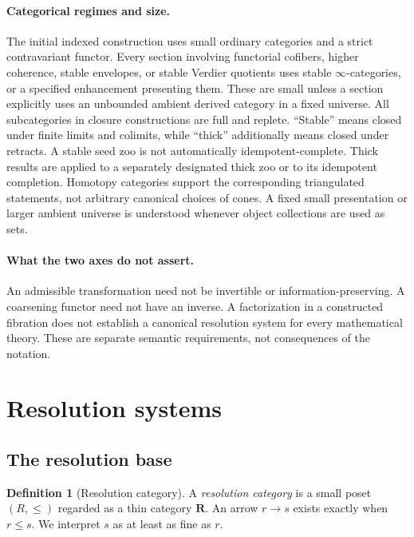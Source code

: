 \documentclass[11pt]{article}
\theoremstyle{definition}
\newtheorem{definition}[theorem]{Definition}
\theoremstyle{remark}
\newcommand{\Rcat}{\mathbf R}
\begin{document}
\paragraph{Categorical regimes and size.}
The initial indexed construction uses small ordinary categories and a strict contravariant functor. Every section involving functorial cofibers, higher coherence, stable envelopes, or stable Verdier quotients uses stable $\infty$-categories, or a specified enhancement presenting them. These are small unless a section explicitly uses an unbounded ambient derived category in a fixed universe. All subcategories in closure constructions are full and replete. ``Stable'' means closed under finite limits and colimits, while ``thick'' additionally means closed under retracts. A stable seed zoo is not automatically idempotent-complete. Thick results are applied to a separately designated thick zoo or to its idempotent completion. Homotopy categories support the corresponding triangulated statements, not arbitrary canonical choices of cones. A fixed small presentation or larger ambient universe is understood whenever object collections are used as sets.

\paragraph{What the two axes do not assert.}
An admissible transformation need not be invertible or information-preserving. A coarsening functor need not have an inverse. A factorization in a constructed fibration does not establish a canonical resolution system for every mathematical theory. These are separate semantic requirements, not consequences of the notation.

\section{Resolution systems}

\subsection{The resolution base}

\begin{definition}[Resolution category]
A \emph{resolution category} is a small poset $(R,\le)$ regarded as a thin category $\Rcat$. An arrow $r\to s$ exists exactly when $r\le s$. We interpret $s$ as at least as fine as $r$.
\end{definition}
\end{document}

